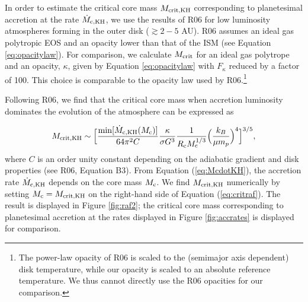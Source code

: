 

In order to estimate the critical core mass $M_{\rm crit, KH}$ corresponding to planetesimal accretion at the rate $\dot{M}_{\rm c, KH}$, we use the results of R06 for low luminosity atmospheres forming in the outer disk ($\gtrsim2-5$ AU). %
R06 assumes an ideal gas polytropic EOS and an opacity lower than that of the ISM (see Equation \ref{eq:opacitylaw}). For comparison, we calculate $M_{\rm crit}$ for an ideal gas polytrope and an opacity, $\kappa$, given by Equation \ref{eq:opacitylaw} with $F_{\kappa}$ reduced by a factor of 100.  This choice is comparable to the opacity law used by R06.\footnote{The power-law opacity of R06 is scaled to the (semimajor axis dependent) disk temperature, while our opacity is scaled to an absolute reference temperature. We thus cannot directly use the R06 opacities for our comparison.} %

Following R06, we find that the critical core mass when accretion luminosity dominates the evolution of the atmosphere can be expressed as

\begin{equation}
\label{eq:critraf}
M_{\rm{crit, KH}} \sim \Big[\frac{\min[\dot{M}_{\rm c, KH}(M_{\rm{c}})]}{64 \pi^2 C} \frac{\kappa}{\sigma G^3} \frac{1}{R_{\rm c} M_{\rm c}^{1/3}} \Big(\frac{k_B}{\mu m_p}\Big)^4\Big]^{3/5},
\end{equation}
where $C$ is an order unity constant depending on the adiabatic gradient and disk properties (see R06, Equation B3). From Equation (\ref{eq:McdotKH}), the accretion rate $\dot{M}_{\rm c, KH}$ depends on the core mass $M_{\rm c}$. We find $M_{\rm crit, KH}$ numerically by setting $M_{\rm c}=M_{\rm crit, KH}$ on the right-hand side of Equation (\ref{eq:critraf}). The result is displayed in Figure \ref{fig:raf2}; the critical core mass corresponding to planetesimal accretion at the rates displayed in Figure \ref{fig:accrates} is displayed for comparison.  

